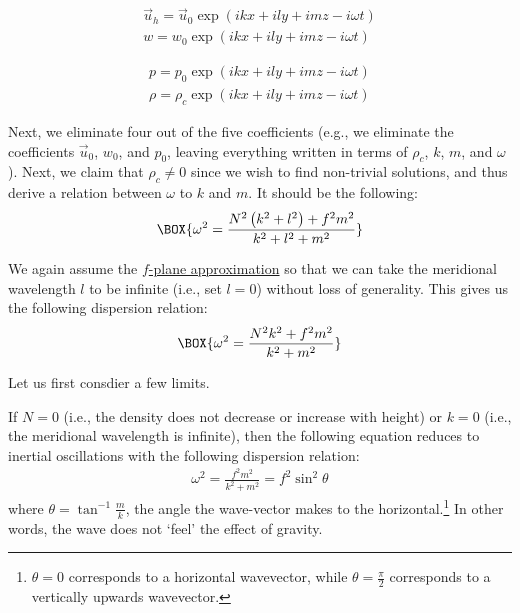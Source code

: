 \vspace{-3mm}
\begin{minipage}{0.48\linewidth}
    \begin{align*}
        \vec{u}_h = \vec{u}_0 \exp \left( ikx + ily + imz - i\omega t \right)
        \\
        w = w_0 \exp \left( ikx + ily + imz - i\omega t \right)
    \end{align*}
\end{minipage}
\hfill
\begin{minipage}{0.48\linewidth}
    \begin{align*}
        p = p_0 \exp \left( ikx + ily + imz - i\omega t \right)
        \\
        \rho = \rho_c \exp \left( ikx + ily + imz - i\omega t \right)
    \end{align*}
\end{minipage}

\vspace{2mm} Next, we eliminate four out of the five coefficients (e.g., we eliminate the coefficients \(\vec{u}_0\), \(w_0\), and \(p_0\), leaving everything written in terms of \(\rho_c\), \(k\), \(m\), and \(\omega\)). Next, we claim that \(\rho_c\neq 0\) since we wish to find non-trivial solutions, and thus derive a relation between \(\omega\) to \(k\) and \(m\). It should be the following:
\begin{gather}
    \BOX{\omega^2 = \frac{N^2 \left( k^2 + l^2 \right) + f^2 m^2}{k^2 + l^2 + m^2}}
\end{gather}

We again assume the \hyperref[f plane box]{\(f\)-plane approximation} so that we can take the meridional wavelength \(l\) to be infinite (i.e., set \(l=0\)) without loss of generality. This gives us the following dispersion relation:
\begin{align}
    \BOX{\omega^2 = \frac{N^2  k^2   + f^2 m^2}{k^2 + m^2}}
\end{align}

Let us first consdier a few limits.

If \(N = 0\) (i.e., the density does not decrease or increase with height) or \(k=0\) (i.e., the meridional wavelength is infinite), then the following equation reduces to inertial oscillations with the following dispersion relation:
\begin{align*}
    \omega^2 = \frac{f^2 m^2}{k^2 + m^2} = f^2 \sin^2 \theta
\end{align*}
where \(\theta = \tan^{-1}\frac{m}{k}\), the angle the wave-vector makes to the horizontal.\footnote{\(\theta = 0\) corresponds to a horizontal wavevector, while \(\theta = \frac{\pi}{2}\) corresponds to a vertically upwards wavevector.} In other words, the wave does not `feel' the effect of gravity.

